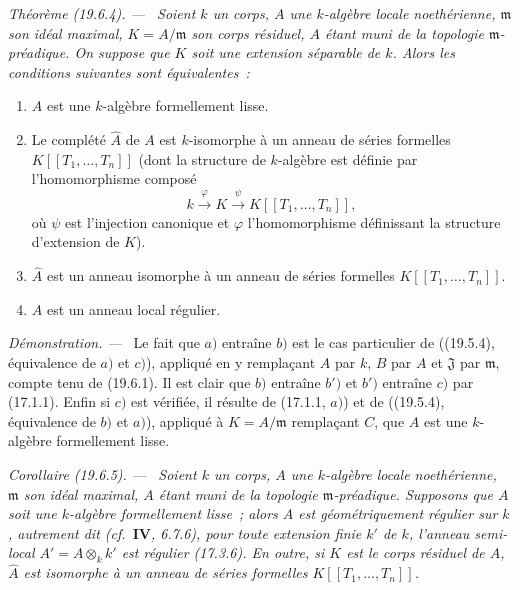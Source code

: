 \documentclass[10pt,oneside]{book}
\makeatletter
\newcommand{\setmanualcurrentlabel}[1]{\def\@currentlabel{#1}}
\newenvironment{theorem}[1][]{%
  \setmanualcurrentlabel{#1}\par\medskip\noindent\itshape Théorème (#1). ---\ }{\par}
\newenvironment{corollary}[1][]{%
  \setmanualcurrentlabel{#1}\par\medskip\noindent\itshape Corollaire (#1). ---\ }{\par}
\newenvironment{proof}{%
  \par\medskip\noindent\textit{Démonstration. ---\ }}{\par}
\makeatother
\begin{document}
\begin{theorem}[19.6.4]
\label{0.19.6.4-fr}
Soient $k$ un corps, $A$ une $k$-algèbre locale noethérienne, $\mathfrak m$ son
idéal maximal, $K=A/\mathfrak m$ son corps résiduel, $A$ étant muni de la
topologie $\mathfrak m$-préadique. On suppose que $K$ soit une extension
séparable de $k$. Alors les conditions suivantes sont équivalentes~:
\begin{enumerate}
  \item[a)] $A$ est une $k$-algèbre formellement lisse.
  \item[b)] Le complété $\widehat A$ de $A$ est $k$-isomorphe à un anneau de
  séries formelles $K[[T_1,\ldots,T_n]]$ (dont la structure de $k$-algèbre est
  définie par l'homomorphisme composé
  \[
    k\xrightarrow{\varphi}K\xrightarrow{\psi}K[[T_1,\ldots,T_n]],
  \]
  où $\psi$ est l'injection canonique et $\varphi$ l'homomorphisme définissant
  la structure d'extension de $K$).
  \item[b')] $\widehat A$ est un anneau isomorphe à un anneau de séries
  formelles $K[[T_1,\ldots,T_n]]$.
  \item[c)] $A$ est un anneau local régulier.
\end{enumerate}
\end{theorem}

\begin{proof}
Le fait que $a)$ entraîne $b)$ est le cas particulier de ((19.5.4),
équivalence de $a)$ et $c)$), appliqué en y remplaçant $A$ par $k$, $B$ par
$A$ et $\mathfrak J$ par $\mathfrak m$, compte tenu de (19.6.1). Il est clair
que $b)$ entraîne $b')$ et $b')$ entraîne $c)$ par (17.1.1). Enfin si $c)$ est
vérifiée, il résulte de (17.1.1, $a)$) et de ((19.5.4), équivalence de $b)$ et
$a)$), appliqué à $K=A/\mathfrak m$ remplaçant $C$, que $A$ est une
$k$-algèbre formellement lisse.
\end{proof}

\begin{corollary}[19.6.5]
\label{0.19.6.5-fr}
Soient $k$ un corps, $A$ une $k$-algèbre locale noethérienne, $\mathfrak m$ son
idéal maximal, $A$ étant muni de la topologie $\mathfrak m$-préadique.
Supposons que $A$ soit une $k$-algèbre formellement lisse~; alors $A$ est
géométriquement régulier sur $k$, autrement dit (cf.~$\mathbf{IV}$, 6.7.6),
pour toute extension finie $k'$ de $k$, l'anneau semi-local
$A'=A\otimes_k k'$ est régulier (17.3.6). En outre, si $K$ est le corps
résiduel de $A$, $\widehat A$ est isomorphe à un anneau de séries formelles
$K[[T_1,\ldots,T_n]]$.
\end{corollary}
\end{document}
